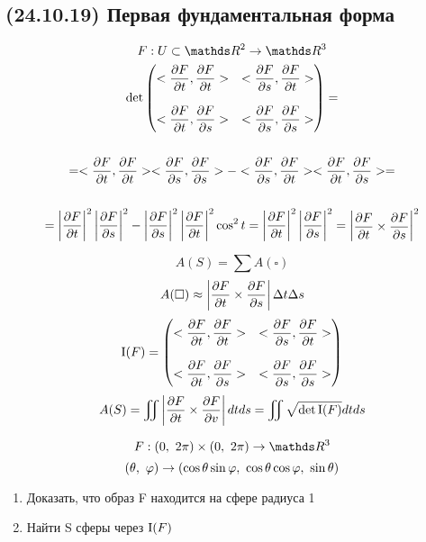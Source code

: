 \documentclass[main]{subfiles}
\begin{document}
    \subsection{(24.10.19) Первая фундаментальная форма}

    \begin{Example}
      \[F: U \subset \R^2 \ra \R^3\]
      \begin{multline*}
        $$\det \begin{pmatrix}
          <\dfrac{\d F}{\d t}, \dfrac{\d F}{\d t}> & <\dfrac{\d F}{\d s}, \dfrac{\d F}{\d t}>\\
          \\
          <\dfrac{\d F}{\d t}, \dfrac{\d F}{\d s}> & <\dfrac{\d F}{\d s}, \dfrac{\d F}{\d s}>
        \end{pmatrix} = \\ \\
          = <\frac{\d F}{\d t}, \frac{\d F}{\d t}> <\frac{\d F}{\d s}, \frac{\d F}{\d s}> - <\frac{\d F}{\d s}, \frac{\d F}{\d t}> <\frac{\d F}{\d t}, \dfrac{\d F}{\d s}> =\\ \\
         =\abs{\dfrac{\d F}{\d t}}^2 \abs{\dfrac{\d F}{\d s}}^2 - \abs{\dfrac{\d F}{\d s}}^2 \abs{\dfrac{\d F}{\d t}}^2 \cos^2 t = \abs{\dfrac{\d F}{\d t}}^2 \abs{\dfrac{\d F}{\d s}}^2
        =
        \begin{vmatrix}
          \dfrac{\d F}{\d t} \times \dfrac{\d F}{\d s}
        \end{vmatrix}^2$$
      \end{multline*}
    \end{Example}

    \begin{Remark}
      \[A(S)=\sum A(\square)\]
      \[A(\square) \approx \left|\dfrac{\partial F}{\partial t} \times \dfrac{\partial F}{\partial s}\right| \Delta t \Delta s\]
      \[\RNumb{1}(F)= \begin{pmatrix}
        <\dfrac{\d F}{\d t}, \dfrac{\d F}{\d t}> & <\dfrac{\d F}{\d s}, \dfrac{\d F}{\d t}>\\
        \\
        <\dfrac{\d F}{\d t}, \dfrac{\d F}{\d s}> & <\dfrac{\d F}{\d s}, \dfrac{\d F}{\d s}>
      \end{pmatrix}\]
      \[A(S)= \iint \abs{\dfrac{\d F}{\d t} \times \dfrac{\d F}{\d v}} dt ds = \iint \sqrt{\det \RNumb{1}(F)} dt ds\]
    \end{Remark}

    \begin{Example}
      \[F: (0,\ 2\pi) \times (0,\ 2\pi) \ra \R^3\]
      \[(\theta,\ \varphi) \rightarrow (\cos \theta \sin \varphi,\ \cos \theta \cos \varphi,\ \sin \theta)\]
      \begin{enumerate}
        \item Доказать, что образ F находится на сфере радиуса 1
        \item Найти S сферы через $\RNumb{1}(F)$
      \end{enumerate}
    \end{Example}
\end{document}
